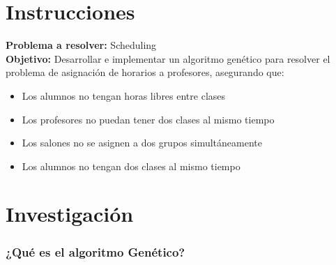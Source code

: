 \section{Instrucciones}

\textbf{Problema a resolver:} Scheduling \\ 


\textbf{Objetivo:} Desarrollar e implementar un algoritmo genético para resolver 
el problema de asignación de horarios a profesores, asegurando que:

\begin{itemize}
    \item Los alumnos no tengan horas libres entre clases
    \item Los profesores no puedan tener dos clases al mismo tiempo
    \item Los salones no se asignen a dos grupos simultáneamente
    \item Los alumnos no tengan dos clases al mismo tiempo
\end{itemize}

\section{Investigación}

\subsubsection*{¿Qué es el algoritmo Genético?}

